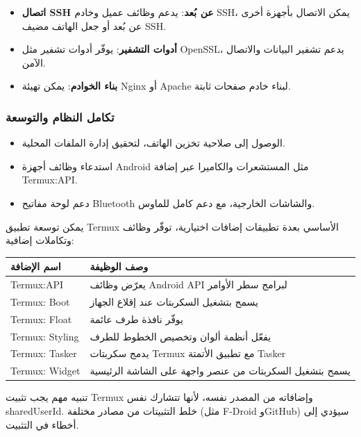 \begin{itemize}
  \item \textbf{اتصال SSH عن بُعد}: يدعم وظائف عميل وخادم SSH، يمكن الاتصال بأجهزة أخرى عن بُعد أو جعل الهاتف مضيف SSH.
  \item \textbf{أدوات التشفير}: يوفّر أدوات تشفير مثل OpenSSL، يدعم تشفير البيانات والاتصال الآمن.
  \item \textbf{بناء الخوادم}: يمكن تهيئة Nginx أو Apache لبناء خادم صفحات ثابتة.
\end{itemize}

\subsubsection*{تكامل النظام والتوسعة}

\begin{itemize}
  \item الوصول إلى صلاحية تخزين الهاتف، لتحقيق إدارة الملفات المحلية.
  \item استدعاء وظائف أجهزة Android مثل المستشعرات والكاميرا عبر إضافة Termux:API.
  \item دعم لوحة مفاتيح Bluetooth والشاشات الخارجية، مع دعم كامل للماوس.
\end{itemize}


يمكن توسعة تطبيق Termux الأساسي بعدة تطبيقات إضافات اختيارية، توفّر وظائف وتكاملات إضافية:

\begin{center}
\begin{tabularx}{\linewidth}{|X|X|}
\hline
\textbf{اسم الإضافة} & \textbf{وصف الوظيفة} \tabularnewline
\hline
Termux:API & يعرّض وظائف Android API لبرامج سطر الأوامر \tabularnewline
Termux: Boot & يسمح بتشغيل السكربتات عند إقلاع الجهاز \tabularnewline
Termux: Float & يوفّر نافذة طرف عائمة \tabularnewline
Termux: Styling & يفعّل أنظمة ألوان وتخصيص الخطوط للطرف \tabularnewline
Termux: Tasker & يدمج سكربتات Termux مع تطبيق الأتمتة Tasker \tabularnewline
Termux: Widget & يسمح بتشغيل السكربتات من عنصر واجهة على الشاشة الرئيسية \tabularnewline
\hline
\end{tabularx}
\end{center}

\begin{tcbwarn}{تنبيه مهم}
يجب تثبيت Termux وإضافاته من المصدر نفسه، لأنها تتشارك نفس sharedUserId. خلط التثبيتات من مصادر مختلفة (مثل F-Droid وGitHub) سيؤدي إلى أخطاء في التثبيت.

\end{tcbwarn}

